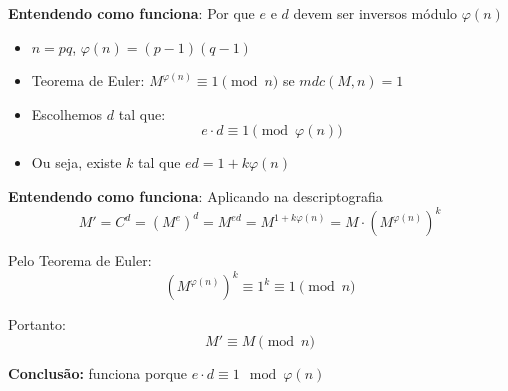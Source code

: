 \begin{frame}{\textbf{Entendendo como funciona}: Por que $e$ e $d$ devem ser inversos módulo $\varphi(n)$}
  \begin{itemize}
    \item \(n = pq\), \(\varphi(n) = (p-1)(q-1)\)
    \item Teorema de Euler: \(M^{\varphi(n)} \equiv 1 \pmod{n}\) se \(mdc(M,n) = 1\)
    \item Escolhemos \(d\) tal que:
          \[
            e \cdot d \equiv 1 \pmod{\varphi(n)}
          \]
    \item Ou seja, existe \(k\) tal que \(ed = 1 + k\varphi(n)\)
  \end{itemize}
\end{frame}

\begin{frame}{\textbf{Entendendo como funciona}: Aplicando na descriptografia}
  \[
    M' = C^d = (M^e)^d = M^{ed} = M^{1 + k\varphi(n)} = M \cdot (M^{\varphi(n)})^k
  \]

  Pelo Teorema de Euler:
  \[
    (M^{\varphi(n)})^k \equiv 1^k \equiv 1 \pmod{n}
  \]

  Portanto:
  \[
    M' \equiv M \pmod{n}
  \]

  \textbf{Conclusão:} funciona porque \(e \cdot d \equiv 1 \mod \varphi(n)\)
\end{frame}

